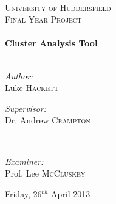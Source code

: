 \begin{titlepage}
  \begin{center}

  ~\\[1cm]

  \textsc{\LARGE University of Huddersfield}\\[1.5cm]

  \textsc{\Large Final Year Project}\\[0.75cm]

  \HRule \\[0.4cm]
    { \huge \bfseries Cluster Analysis Tool }
  \\[0.1cm]

  \HRule \\[2cm]

  \begin{minipage}{0.4\textwidth}
    \begin{flushleft} \large
      \emph{Author:}\\
      Luke \textsc{Hackett}
    \end{flushleft}
  \end{minipage}
  \begin{minipage}{0.4\textwidth}
    \begin{flushright} \large
      \emph{Supervisor:} \\
      Dr. Andrew \textsc{Crampton}
    \end{flushright}
  \end{minipage}

  ~\\[0.1cm]

  \begin{minipage}{0.4\textwidth}
    \begin{flushleft}
    \end{flushleft}
  \end{minipage}
  \begin{minipage}{0.4\textwidth}
    \begin{flushright} \large
      \emph{Examiner:} \\
      Prof. Lee \textsc{McCluskey}
    \end{flushright}
  \end{minipage}

  \vfill

  {\large Friday, 26$^t$$^h$ April 2013}

  \end{center}
\end{titlepage}